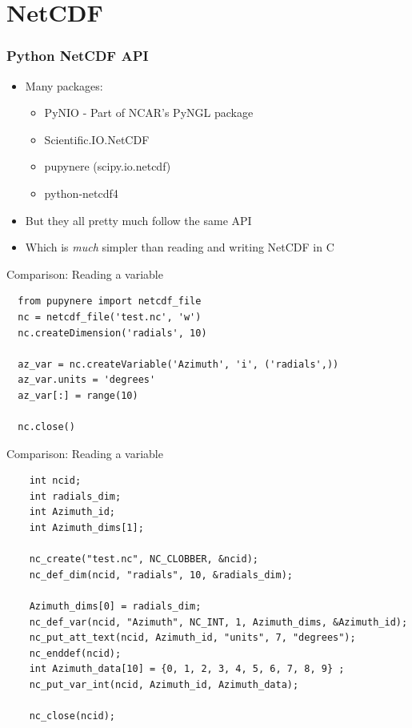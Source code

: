 \documentclass[red, hyperref={pdfpagelabels=false}]{beamer}
\begin{document}
\section{NetCDF}
\begin{frame}
  \frametitle{Python NetCDF API}
  \begin{itemize}
    \item Many packages:
    \begin{itemize}
      \item PyNIO - Part of NCAR's PyNGL package
      \item Scientific.IO.NetCDF
      \item pupynere (scipy.io.netcdf)
      \item python-netcdf4
    \end{itemize}
    \item But they all pretty much follow the same API
    \item Which is \emph{much} simpler than reading and writing NetCDF in C
  \end{itemize}
\end{frame}

\begin{frame}[fragile]{Comparison: Reading a variable}
  \lstset{language=Python}
  \begin{lstlisting}
  from pupynere import netcdf_file
  nc = netcdf_file('test.nc', 'w')
  nc.createDimension('radials', 10)

  az_var = nc.createVariable('Azimuth', 'i', ('radials',))
  az_var.units = 'degrees'
  az_var[:] = range(10)

  nc.close()
  \end{lstlisting}
\end{frame}

\begin{frame}[fragile]{Comparison: Reading a variable}
  \lstset{language=C}
  \begin{lstlisting}
    int ncid;
    int radials_dim;
    int Azimuth_id;
    int Azimuth_dims[1];

    nc_create("test.nc", NC_CLOBBER, &ncid);
    nc_def_dim(ncid, "radials", 10, &radials_dim);

    Azimuth_dims[0] = radials_dim;
    nc_def_var(ncid, "Azimuth", NC_INT, 1, Azimuth_dims, &Azimuth_id);
    nc_put_att_text(ncid, Azimuth_id, "units", 7, "degrees");
    nc_enddef(ncid);
    int Azimuth_data[10] = {0, 1, 2, 3, 4, 5, 6, 7, 8, 9} ;
    nc_put_var_int(ncid, Azimuth_id, Azimuth_data);

    nc_close(ncid);
  \end{lstlisting}
\end{frame}
\end{document}
